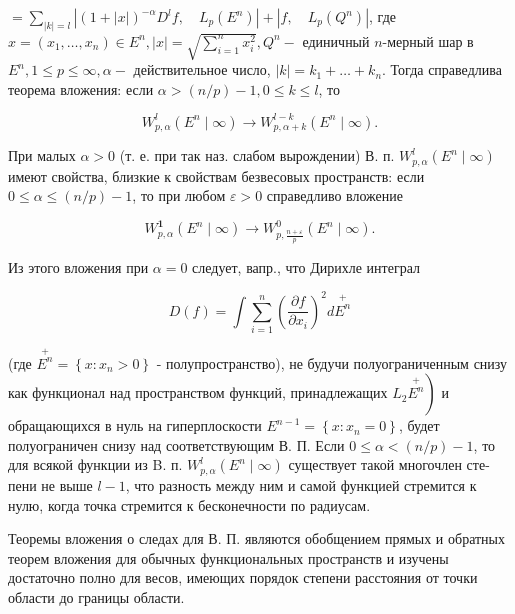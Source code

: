 \documentclass[10pt]{article}
\begin{document}
$=\sum_{|k|=l}\left|(1+|x|)^{-\alpha} D^{l} f, \quad L_{p}\left(E^{n}\right)\right|+\left|f, \quad L_{p}\left(Q^{n}\right)\right|$, где $x=\left(x_{1}, \ldots, x_{n}\right) \in E^{n},|x|=\sqrt{\sum_{i=1}^{n} x_{i}^{2}}, Q^{n}-$ единичный $n$-мерный шар в $E^{n}, 1 \leqslant p \leqslant \infty, \alpha-$ действительное число, $|k|=k_{1}+\ldots+k_{n}$. Тогда справедлива теорема вложения: если $\alpha>(n / p)-1,0 \leqslant k \leqslant l$, то



\[

W_{p, \alpha}^{l}\left(E^{n} \mid \infty\right) \longrightarrow W_{p, \alpha+k}^{l-k}\left(E^{n} \mid \infty\right) .

\]



При малых $\alpha>0$ (т. е. при так наз. слабом вырождении) В. п. $W_{p, \alpha}^{l}\left(E^{n} \mid \infty\right)$ имеют свойства, близкие к свойствам безвесовых пространств: если $0 \leqslant \alpha \leqslant(n / p)-1$, то при любом $\varepsilon>0$ справедливо вложение



\[

W_{p, \alpha}^{\mathbf{1}}\left(E^{n} \mid \infty\right) \longrightarrow W_{p, \frac{n+\varepsilon}{p}}^{0}\left(E^{n} \mid \infty\right) .

\]



Из этого вложения при $\alpha=0$ следует, вапр., что Дирихле интеграл



\[

D(f)=\int \sum_{i=1}^{n}\left(\frac{\partial f}{\partial x_{i}}\right)^{2} d \stackrel{+}{E^{n}}

\]



(где $\stackrel{+}{E^{n}}=\left\{x: x_{n}>0\right\}$ - полупространство), не будучи полуограниченным снизу как функционал над пространством функций, принадлежащих $\left.L_{2} \stackrel{+}{E^{n}}\right)$ и обращающихся в нуль на гиперплоскости $E^{n-1}=\left\{x: x_{n}=0\right\}$, будет полуограничен снизу над соответствующим В. П. Если $0 \leqslant \alpha<(n / p)-1$, то для всякой функции из B. п. $W_{p, \alpha}^{l}\left(E^{n} \mid \infty\right)$ существует такой многочлен сте- пени не выше $l-1$, что разность между ним и самой функцией стремится к нулю, когда точка стремится к бесконечности по радиусам.



Теоремы вложения о следах для В. П. являются обобщением прямых и обратных теорем вложения для обычных функциональных пространств и изучены достаточно полно для весов, имеющих порядок степени расстояния от точки области до границы области.
\end{document}
